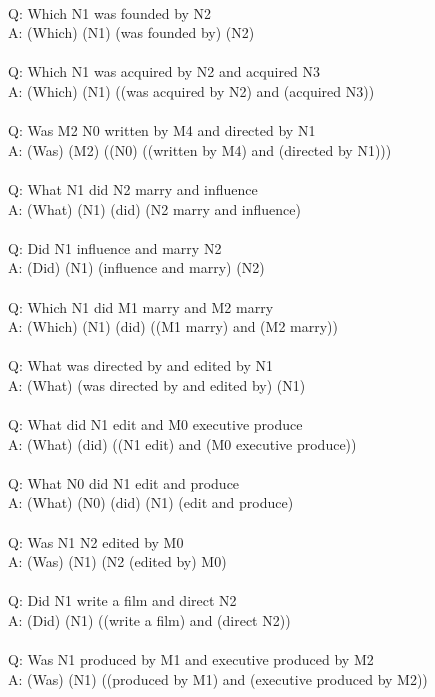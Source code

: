 \documentclass{article} \usepackage{iclr2022_conference,times}
\begin{document}
{ \\
Q: Which N1 was founded by N2 \\
A: (Which) (N1) (was founded by) (N2) \\
 \\
Q: Which N1 was acquired by N2 and acquired N3 \\
A: (Which) (N1) ((was acquired by N2) and (acquired N3)) \\
 \\
Q: Was M2 N0 written by M4 and directed by N1 \\
A: (Was) (M2) ((N0) ((written by M4) and (directed by N1))) \\
 \\
Q: What N1 did N2 marry and influence \\
A: (What) (N1) (did) (N2 marry and influence) \\
 \\
Q: Did N1 influence and marry N2 \\
A: (Did) (N1) (influence and marry) (N2) \\
 \\
Q: Which N1 did M1 marry and M2 marry \\
A: (Which) (N1) (did) ((M1 marry) and (M2 marry)) \\
 \\
Q: What was directed by and edited by N1 \\
A: (What) (was directed by and edited by) (N1) \\
 \\
Q: What did N1 edit and M0 executive produce \\
A: (What) (did) ((N1 edit) and (M0 executive produce)) \\
 \\
Q: What N0 did N1 edit and produce \\
A: (What) (N0) (did) (N1) (edit and produce) \\
 \\
Q: Was N1 N2 edited by M0 \\
A: (Was) (N1) (N2 (edited by) M0) \\
 \\
Q: Did N1 write a film and direct N2 \\
A: (Did) (N1) ((write a film) and (direct N2)) \\
 \\
Q: Was N1 produced by M1 and executive produced by M2 \\
A: (Was) (N1) ((produced by M1) and (executive produced by M2)) \\
}
\end{document}

